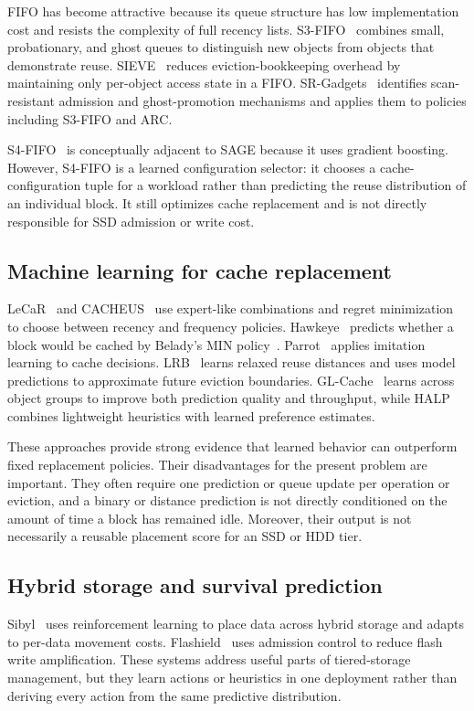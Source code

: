 \documentclass[conference]{IEEEtran}
\begin{document}
FIFO has become attractive because its queue structure has low implementation cost and resists the complexity of full recency lists. S3-FIFO~\cite{s3fifo} combines small, probationary, and ghost queues to distinguish new objects from objects that demonstrate reuse. SIEVE~\cite{sieve} reduces eviction-bookkeeping overhead by maintaining only per-object access state in a FIFO. SR-Gadgets~\cite{srgadgets} identifies scan-resistant admission and ghost-promotion mechanisms and applies them to policies including S3-FIFO and ARC.

S4-FIFO~\cite{s4fifo} is conceptually adjacent to SAGE because it uses gradient boosting. However, S4-FIFO is a learned configuration selector: it chooses a cache-configuration tuple for a workload rather than predicting the reuse distribution of an individual block. It still optimizes cache replacement and is not directly responsible for SSD admission or write cost.

\subsection{Machine learning for cache replacement}
LeCaR~\cite{lecar} and CACHEUS~\cite{cacheus} use expert-like combinations and regret minimization to choose between recency and frequency policies. Hawkeye~\cite{hawkeye} predicts whether a block would be cached by Belady's MIN policy~\cite{belady}. Parrot~\cite{parrot} applies imitation learning to cache decisions. LRB~\cite{lrb} learns relaxed reuse distances and uses model predictions to approximate future eviction boundaries. GL-Cache~\cite{glcache} learns across object groups to improve both prediction quality and throughput, while HALP~\cite{halp} combines lightweight heuristics with learned preference estimates.

These approaches provide strong evidence that learned behavior can outperform fixed replacement policies. Their disadvantages for the present problem are important. They often require one prediction or queue update per operation or eviction, and a binary or distance prediction is not directly conditioned on the amount of time a block has remained idle. Moreover, their output is not necessarily a reusable placement score for an SSD or HDD tier.

\subsection{Hybrid storage and survival prediction}
Sibyl~\cite{sibyl} uses reinforcement learning to place data across hybrid storage and adapts to per-data movement costs. Flashield~\cite{flashield} uses admission control to reduce flash write amplification. These systems address useful parts of tiered-storage management, but they learn actions or heuristics in one deployment rather than deriving every action from the same predictive distribution.
\end{document}
